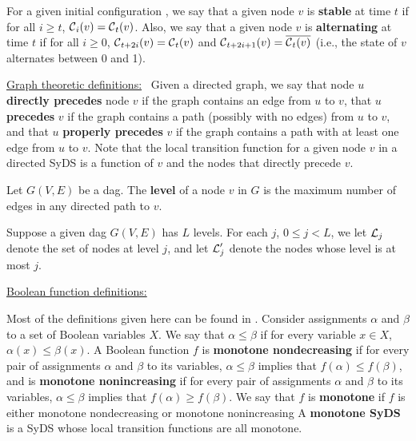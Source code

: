 For a given initial configuration \calc{},
we  say that a given node $v$ is \textbf{stable} at time $t$ if
for all $i \geq t$, $\mbox{$\mathcal{C}$}_i(v)= \mbox{$\mathcal{C}$}_t(v)$.
Also, we say that a given node $v$ is \textbf{alternating} at time $t$ if
for all $i \geq 0$, 
$\mbox{$\mathcal{C}$}_{t+2i}(v) =  \mbox{$\mathcal{C}$}_t(v)$ 
and $\mbox{$\mathcal{C}$}_{t+2i+1}(v) = \overline{ \mbox{$\mathcal{C}$}_t(v)}$ 
(i.e., the state of $v$ alternates between 0 and 1).  


\smallskip
\noindent
\underline{\textsf{Graph theoretic definitions:}}~
Given a directed graph, we say that node $u$ {\bf directly precedes}
node $v$ if the graph contains an edge from $u$ to $v$,
that $u$ {\bf precedes} $v$ if the graph contains a path (possibly
with no edges) from $u$ to $v$,
and that $u$ {\bf properly precedes} $v$
if the graph contains a path with at least one edge  from $u$ to $v$.
Note that the local transition function for a given node $v$  in a
directed SyDS is a function of $v$
and the nodes that directly precede $v$.

\begin{definition}\label{def:dag_level}
Let $G(V,E)$ be a dag.
The \textbf{level} of a node $v$  in $G$ is the maximum number
of edges in any directed path to $v$.
\end{definition}

Suppose a given dag $G(V,E)$ has $L$ levels. 
For each $j$, $0 \leq j < L$, we let $\mbox{$\mathcal{L}$}_j$ denote the set of nodes at level $j$,
and let $\mbox{$\mathcal{L}$}_j'$ denote the nodes whose level is at most $j$.

\smallskip
\noindent
\underline{\textsf{Boolean function definitions:}}~
\iffalse
A {\bf linear} Boolean function is one that can be expressed as a
linear equation mod 2 of its variables, i.e., the xor or complement
of the xor of its variables.  A {\bf linear SyDS} is a SyDS whose
local transition functions are all linear.
\fi
Most of the definitions given here can be found in
\cite{Crama-Hammer-2011}.  Consider assignments $\alpha$ and $\beta$
to a set of Boolean variables $X$.  We say that $\alpha \leq \beta$
if for every variable $x \in X$, $\alpha(x) \leq \beta(x)$.  A
Boolean function $f$  is {\bf monotone nondecreasing} if for every
pair of assignments $\alpha$ and $\beta$ to its variables, $\alpha
\leq \beta$ implies that $f(\alpha) \leq f(\beta)$, and is {\bf
monotone nonincreasing} if for every pair of assignments $\alpha$
and $\beta$ to its variables, $\alpha \leq \beta$ implies that
$f(\alpha) \geq f(\beta)$.  We say that $f$ is {\bf monotone} if
$f$ is either monotone nondecreasing or monotone nonincreasing A
{\bf monotone SyDS} is a SyDS whose local transition functions are
all monotone.


